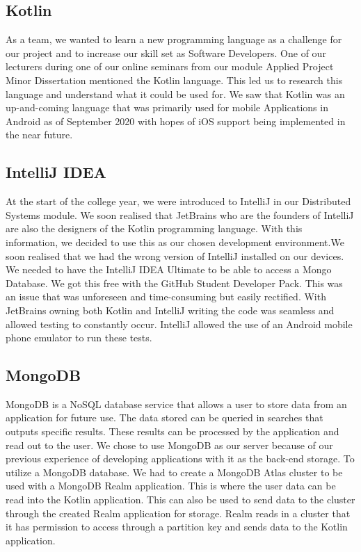 \subsection{Kotlin}
As a team, we wanted to learn a new programming language as a challenge for our project and to increase our skill set as Software Developers. One of our lecturers during one of our online seminars from our module Applied Project Minor Dissertation mentioned the Kotlin language. This led us to research this language and understand what it could be used for. We saw that Kotlin was an up-and-coming language that was primarily used for mobile Applications in Android as of September 2020 with hopes of iOS support being implemented in the near future.
\subsection{IntelliJ IDEA}
At the start of the college year, we were introduced to IntelliJ in our Distributed Systems module. We soon realised that JetBrains who are the founders of IntelliJ are also the designers of the Kotlin programming language. With this information, we decided to use this as our chosen development environment.We soon realised that we had the wrong version of IntelliJ installed on our devices. We needed to have the IntelliJ IDEA Ultimate to be able to access a Mongo Database. We got this free with the GitHub Student Developer Pack. This was an issue that was unforeseen and time-consuming but easily rectified. With JetBrains owning both Kotlin and IntelliJ writing the code was seamless and allowed testing to constantly occur. IntelliJ allowed the use of an Android mobile phone emulator to run these tests.
\subsection{MongoDB}
MongoDB is a NoSQL database service that allows a user to store data from an application for future use. The data stored can be queried in searches that outputs specific results. These results can be processed by the application and read out to the user. We chose to use MongoDB as our server because of our previous experience of developing applications with it as the back-end storage.
\newline
\newline
To utilize a MongoDB database. We had to create a MongoDB Atlas \newline cluster to be used with a MongoDB Realm application. This is where the user data can be read into the Kotlin application. This can also be used to send data to the cluster through the created Realm application for storage. Realm reads in a cluster that it has permission to access through a partition key and sends data to the Kotlin application.
